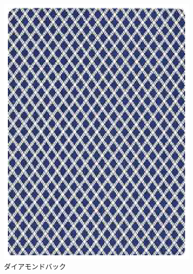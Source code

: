 \begin{figure}[htbp]
    \begin{center}
    \includegraphics[scale=0.72]{image/bee.eps}
    \caption{ダイアモンドバック}
    \label{casino}
    \end{center}
\end{figure}
